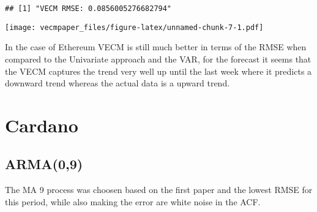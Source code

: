 \documentclass[
]{article}
\newenvironment{Shaded}{\begin{snugshade}}{\end{snugshade}}
\newcommand{\AttributeTok}[1]{\textcolor[rgb]{0.77,0.63,0.00}{#1}}
\newcommand{\DecValTok}[1]{\textcolor[rgb]{0.00,0.00,0.81}{#1}}
\newcommand{\FunctionTok}[1]{\textcolor[rgb]{0.00,0.00,0.00}{#1}}
\newcommand{\NormalTok}[1]{#1}
\newcommand{\OtherTok}[1]{\textcolor[rgb]{0.56,0.35,0.01}{#1}}
\newcommand{\SpecialCharTok}[1]{\textcolor[rgb]{0.00,0.00,0.00}{#1}}
\newcommand{\StringTok}[1]{\textcolor[rgb]{0.31,0.60,0.02}{#1}}
\begin{document}
\begin{verbatim}
## [1] "VECM RMSE: 0.0856005276682794"
\end{verbatim}

\begin{Shaded}
\end{Shaded}

\texttt{[image: vecmpaper\_files/figure-latex/unnamed-chunk-7-1.pdf]}

In the case of Ethereum VECM is still much better in terms of the RMSE
when compared to the Univariate approach and the VAR, for the forecast
it seems that the VECM captures the trend very well up until the last
week where it predicts a downward trend whereas the actual data is a
upward trend.

\hypertarget{cardano}{%
\section{Cardano}\label{cardano}}

\hypertarget{arma09}{%
\subsection{ARMA(0,9)}\label{arma09}}

The MA 9 process was choosen based on the first paper and the lowest
RMSE for this period, while also making the error are white noise in the
ACF.
\end{document}
